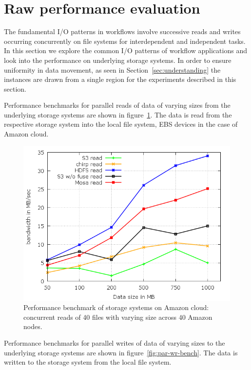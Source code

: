 \documentclass{sig-alternate}
\begin{document}
\section{Raw performance evaluation}\label{sec:perf}
The fundamental I/O patterns in workflows involve successive reads and writes
occurring concurrently on file systems for interdependent and independent
tasks. In this section we explore the common I/O patterns of workflow
applications and look into the performance on underlying storage systems. In order to
ensure uniformity in data movement, as seen in Section~\ref{sec:understanding}
the instances are drawn from a single region for the experiments described in
this section.

Performance benchmarks for parallel reads of data of varying sizes from the
underlying storage systems are shown in figure~\ref{fig:par-rd-bench}. The data
is read from the respective storage system into the local file system, EBS
devices in the case of Amazon cloud.

\begin{figure}[htb]
\begin{center}
\includegraphics[width=\linewidth]{plots/par-read-bw.png}
\caption{Performance benchmark of storage systems on Amazon cloud:
concurrent reads of 40 files with varying size across 40 Amazon nodes.
\label{fig:par-rd-bench} }
\end{center}
\end{figure}

Performance benchmarks for parallel writes of data of varying sizes to the
underlying storage systems are shown in figure~\ref{fig:par-wr-bench}. The data
is written to the storage system from the local file system.
\end{document}
